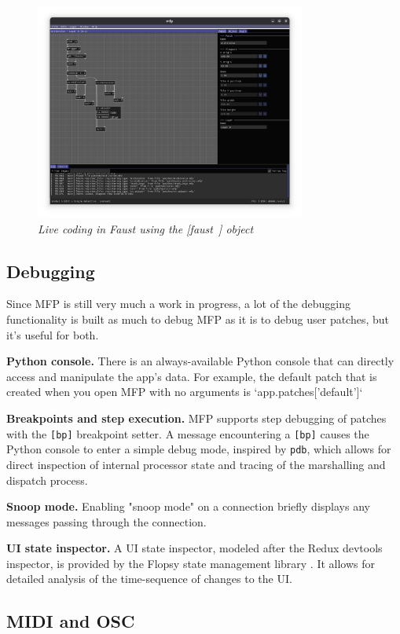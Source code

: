\documentclass[a4paper]{article}
\begin{document}
\begin{figure}[ht]
\centerline{\includegraphics[width=3.5in]{faust_livecoding.png}}
\caption{\label{fig:pythonlivecoding}{
    \it Live coding in Faust using the [faust~] object
}}
\end{figure}


\subsection{Debugging}

Since MFP is still very much a work in progress, a lot of the
debugging functionality is built as much to debug MFP as it is to
debug user patches, but it's useful for both.

{\bf Python console.} There is an always-available Python console
that can directly access and manipulate the app's data.  For example, the
default patch that is created when you open MFP with no arguments is
`app.patches['default']`

{\bf Breakpoints and step execution.} MFP supports step debugging
of patches with the {\tt [bp]} breakpoint setter. A message
encountering a {\tt [bp]} causes the Python console to enter a simple
debug mode, inspired by {\tt pdb}, which allows for direct inspection
of internal processor state and tracing of the marshalling and
dispatch process.

{\bf Snoop mode.} Enabling "snoop mode" on a connection briefly
displays any messages passing through the connection.

{\bf UI state inspector.} A UI state inspector, modeled after the
Redux devtools inspector, is provided by the Flopsy state
management library \cite{Gribble:Flopsy}. It allows for detailed analysis of the
time-sequence of changes to the UI.

\subsection{MIDI and OSC}
\end{document}
